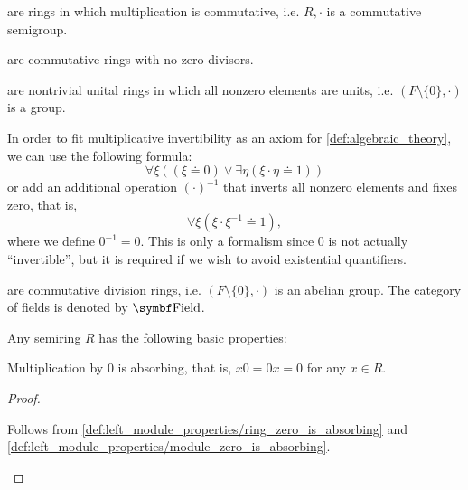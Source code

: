 \begin{definition}
\begin{defenum}
      are rings in which multiplication is commutative, i.e. \( R, \cdot \) is a commutative semigroup.

      are commutative rings with no zero divisors.

      are nontrivial unital rings in which all nonzero elements are units, i.e. \( (F \setminus \{ 0 \}, \cdot) \) is a group.

    In order to fit multiplicative invertibility as an axiom for \cref{def:algebraic_theory}, we can use the following formula:
    \begin{equation*}
      \forall \xi ((\xi \doteq 0) \lor \exists \eta (\xi \cdot \eta \doteq 1))
    \end{equation*}
    or add an additional operation \( (\cdot)^{-1} \) that inverts all nonzero elements and fixes zero, that is,
    \begin{equation*}
      \forall \xi (\xi \cdot \xi^{-1} \doteq 1),
    \end{equation*}
    where we define \( 0^{-1} = 0 \). This is only a formalism since \( 0 \) is not actually \enquote{invertible}, but it is required if we wish to avoid existential quantifiers.

      are commutative division rings, i.e. \( (F \setminus \{ 0 \}, \cdot) \) is an abelian group. The category of fields is denoted by \( \Cat{Field} \).
  \end{defenum}
\end{definition}

\begin{proposition}\label{def:semiring_properties}
  Any semiring \( R \) has the following basic properties:
  \begin{defenum}
     Multiplication by \( 0 \) is absorbing, that is, \( x0 = 0x = 0 \) for any \( x \in R \).
  \end{defenum}
\end{proposition}
\begin{proof}\mbox{}
  \begin{itemize}
     Follows from \cref{def:left_module_properties/ring_zero_is_absorbing} and \cref{def:left_module_properties/module_zero_is_absorbing}.
  \end{itemize}
\end{proof}

